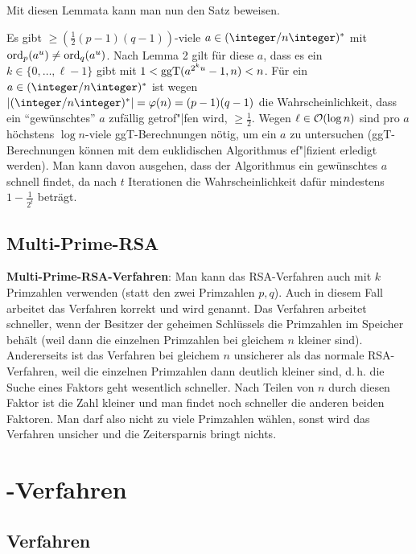 \linie

Mit diesen Lemmata kann man nun den Satz beweisen.

\begin{Beweis}
    Es gibt $\ge (\frac{1}{2} (p-1)(q-1))$-viele $a \in (\ZnZ)^\ast$ mit
    $\operatorname{ord}_p(a^u) \not= \operatorname{ord}_q(a^u)$.
    Nach Lemma 2 gilt für diese $a$, dass es ein $k \in \{0, \dotsc, \ell - 1\}$ gibt mit
    $1 < \operatorname{ggT}(a^{2^k u} - 1, n) < n$.
    Für ein $a \in (\ZnZ)^\ast$ ist wegen $|(\ZnZ)^\ast| = \varphi(n) = (p-1)(q-1)$
    die Wahrscheinlichkeit, dass ein "`gewünschtes"' $a$ zufällig getrof"|fen wird,
    $\ge \frac{1}{2}$.
    Wegen $\ell \in \mathcal{O}(\log n)$ sind pro $a$ höchstens $\log n$-viele ggT-Berechnungen nötig,
    um ein $a$ zu untersuchen (ggT-Berechnungen können mit dem euklidischen Algorithmus
    ef"|fizient erledigt werden).
    Man kann davon ausgehen, dass der Algorithmus ein gewünschtes $a$ schnell findet,
    da nach $t$ Iterationen die Wahrscheinlichkeit dafür mindestens $1 - \frac{1}{2^t}$
    beträgt.
\end{Beweis}

\subsection{%
    Multi-Prime-RSA%
}

\textbf{Multi-Prime-RSA-Verfahren}:
Man kann das RSA-Verfahren auch mit $k$ Primzahlen verwenden (statt den zwei Primzahlen $p, q$).
Auch in diesem Fall arbeitet das Verfahren korrekt
und wird  genannt.
Das Verfahren arbeitet schneller, wenn der Besitzer der geheimen Schlüssels die Primzahlen im
Speicher behält (weil dann die einzelnen Primzahlen bei gleichem $n$ kleiner sind).
Andererseits ist das Verfahren bei gleichem $n$ unsicherer als das normale RSA-Verfahren,
weil die einzelnen Primzahlen dann deutlich kleiner sind,
d.\,h. die Suche eines Faktors geht wesentlich schneller.
Nach Teilen von $n$ durch diesen Faktor ist die Zahl kleiner und man findet noch schneller
die anderen beiden Faktoren.
Man darf also nicht zu viele Primzahlen wählen, sonst wird das Verfahren unsicher und
die Zeitersparnis bringt nichts.

\pagebreak

\section{%
    -Verfahren%
}

\subsection{%
    Verfahren%
}

